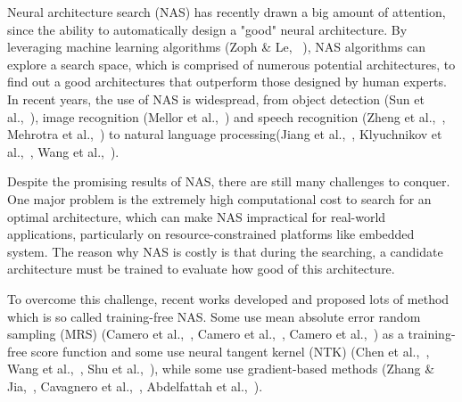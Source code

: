 \documentclass[conference]{IEEEtran}
\begin{document}
    Neural architecture search (NAS) has recently drawn a big amount of 
    attention, since the ability to automatically design a "good" neural 
    architecture. By leveraging machine learning algorithms (Zoph \& Le,
    \ \cite{https://doi.org/10.48550/arxiv.1611.01578}), NAS algorithms 
    can explore a search space, which is comprised of numerous potential 
    architectures, to find out a good architectures that outperform those 
    designed by human experts. In recent years, the use of NAS is widespread, 
    from object detection (Sun et al.,\ \cite{https://doi.org/10.48550/arxiv.2111.13336}), 
    image recognition (Mellor et al.,\ \cite{https://doi.org/10.48550/arxiv.2006.04647}) 
    and speech recognition (Zheng et al.,\ \cite{https://doi.org/10.48550/arxiv.2011.05649}, 
    Mehrotra et al.,\ \cite{mehrotra2021nasbenchasr}) to natural language 
    processing(Jiang et al.,\ \cite{jiang-etal-2019-improved}, 
    Klyuchnikov et al.,\ \cite{https://doi.org/10.48550/arxiv.2006.07116}, 
    Wang et al.,\ \cite{https://doi.org/10.48550/arxiv.2005.14187}).

    Despite the promising results of NAS, there are still many challenges 
    to conquer. One major problem is the extremely high computational 
    cost to search for an optimal architecture, which can make NAS impractical 
    for real-world applications, particularly on resource-constrained 
    platforms like embedded system. The reason why NAS is costly is that 
    during the searching, a candidate architecture must be trained to 
    evaluate how good of this architecture.

    To overcome this challenge, recent works developed and proposed lots 
    of method which is so called training-free NAS. Some use mean absolute 
    error random sampling (MRS) (Camero et al.,\ \cite{https://doi.org/10.48550/arxiv.1805.07159}, 
    Camero et al.,\ \cite{Camero_2021}, Camero et al.,\ \cite{https://doi.org/10.48550/arxiv.2106.15295}) 
    as a training-free score function and some use neural tangent kernel 
    (NTK) (Chen et al.,\ \cite{https://doi.org/10.48550/arxiv.2102.11535}, 
    Wang et al.,\ \cite{https://doi.org/10.48550/arxiv.2203.09137}, 
    Shu et al.,\ \cite{https://doi.org/10.48550/arxiv.2109.00817}), while 
    some use gradient-based methods (Zhang \& Jia,\ \cite{https://doi.org/10.48550/arxiv.2110.08616}, 
    Cavagnero et al.,\ \cite{https://doi.org/10.48550/arxiv.2207.05135}, 
    Abdelfattah et al.,\ \cite{https://doi.org/10.48550/arxiv.2101.08134}).
\end{document}
